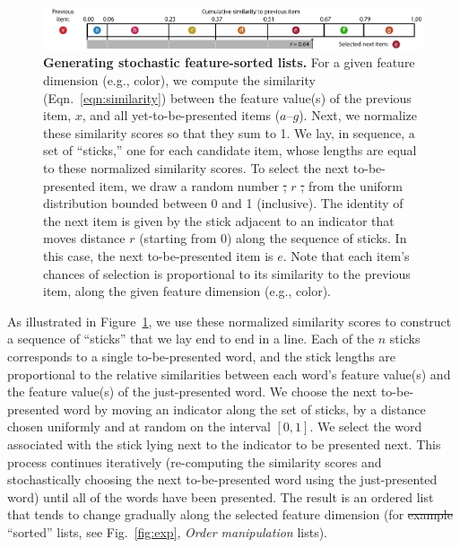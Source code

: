 \documentclass[11pt]{article}
\providecommand{\DIFaddtex}[1]{{\protect\color{blue}\uwave{#1}}} %
\providecommand{\DIFdeltex}[1]{{\protect\color{red}\sout{#1}}}                      %
\providecommand{\DIFaddbegin}{} %
\providecommand{\DIFaddend}{} %
\providecommand{\DIFdelbegin}{} %
\providecommand{\DIFdelend}{} %
\providecommand{\DIFdelFL}[1]{\DIFdel{#1}} %
\providecommand{\DIFdelbeginFL}{} %
\providecommand{\DIFdelendFL}{} %
\providecommand{\DIFadd}[1]{\texorpdfstring{\DIFaddtex{#1}}{#1}} %
\providecommand{\DIFdel}[1]{\texorpdfstring{\DIFdeltex{#1}}{}} %
\newcommand{\DIFscaledelfig}{0.5}
\newlength{\DIFdelgraphicswidth} %
\newlength{\DIFdelgraphicsheight} %
\newcommand{\DIFaddincludegraphics}[2][]{{\color{blue}\fbox{\DIFOincludegraphics[#1]{#2}}}} %
\newcommand{\DIFdelincludegraphics}[2][]{%
\sbox{\DIFdelgraphicsbox}{\DIFOincludegraphics[#1]{#2}}%
\settoboxwidth{\DIFdelgraphicswidth}{\DIFdelgraphicsbox} %
\settoboxtotalheight{\DIFdelgraphicsheight}{\DIFdelgraphicsbox} %
\scalebox{\DIFscaledelfig}{%
\parbox[b]{\DIFdelgraphicswidth}{\usebox{\DIFdelgraphicsbox}\\[-\baselineskip] \rule{\DIFdelgraphicswidth}{0em}}\llap{\resizebox{\DIFdelgraphicswidth}{\DIFdelgraphicsheight}{%
\setlength{\unitlength}{\DIFdelgraphicswidth}%
\begin{picture}(1,1)%
\thicklines\linethickness{2pt} %
{\color[rgb]{1,0,0}\put(0,0){\framebox(1,1){}}}%
{\color[rgb]{1,0,0}\put(0,0){\line( 1,1){1}}}%
{\color[rgb]{1,0,0}\put(0,1){\line(1,-1){1}}}%
\end{picture}%
}\hspace*{3pt}}} %
} %
\DeclareRobustCommand{\DIFaddbegin}{\DIFOaddbegin \let\includegraphics\DIFaddincludegraphics} %
\DeclareRobustCommand{\DIFaddend}{\DIFOaddend \let\includegraphics\DIFOincludegraphics} %
\DeclareRobustCommand{\DIFdelbegin}{\DIFOdelbegin \let\includegraphics\DIFdelincludegraphics} %
\DeclareRobustCommand{\DIFdelend}{\DIFOaddend \let\includegraphics\DIFOincludegraphics} %
\DeclareRobustCommand{\DIFdelbeginFL}{\DIFOdelbeginFL \let\includegraphics\DIFdelincludegraphics} %
\DeclareRobustCommand{\DIFdelendFL}{\DIFOaddendFL \let\includegraphics\DIFOincludegraphics} %
\begin{document}
\begin{figure}[tp]
    \centering
        \includegraphics[width=\textwidth]{figures/stick}

\caption{\textbf{Generating stochastic feature-sorted lists.} For a given
feature dimension (e.g., color), we compute the similarity
(Eqn.~\ref{eqn:similarity}) between the feature value(s) of the previous item,
$x$, and all yet-to-be-presented items ($a$--$g$). Next, we normalize these
similarity scores so that they sum to 1. We lay, in sequence, a set of
``sticks,'' one for each candidate item, whose lengths are equal to these
normalized similarity scores. To select the next to-be-presented item, we draw
a random number \DIFdelbeginFL \DIFdelFL{, }\DIFdelendFL $r$ \DIFdelbeginFL \DIFdelFL{, }\DIFdelendFL from the uniform distribution bounded between 0 and 1
(inclusive). The identity of the next item is given by the stick adjacent to an
indicator that moves distance $r$ (starting from 0) along the sequence of
sticks. In this case, the next to-be-presented item is $e$. Note that each
item's chances of selection is proportional to its similarity to the previous
item, along the given feature dimension (e.g., color).} \label{fig:stick}

\end{figure}

As illustrated in Figure~\ref{fig:stick}, we use these normalized similarity
scores to construct a sequence of ``sticks'' that we lay end to end in a line.
Each of the $n$ sticks corresponds to a single to-be-presented word, and the
stick lengths are proportional to the relative similarities between each word's
feature value(s) and the feature value(s) of the just-presented word. We choose
the next to-be-presented word by moving an indicator along the set of sticks,
by a distance chosen uniformly and at random on the interval $\left[0,
1\right]$. We select the word associated with the stick lying next to the
indicator to be presented next. This process continues iteratively
(re-computing the similarity scores and stochastically choosing the next
to-be-presented word using the just-presented word) until all of the words have
been presented. The result is an ordered list that tends to change gradually
along the selected feature dimension (for \DIFdelbegin \DIFdel{example }\DIFdelend \DIFaddbegin \DIFadd{examples of }\DIFaddend ``sorted'' lists, see
Fig.~\ref{fig:exp}, \textit{Order manipulation} lists).
\end{document}
